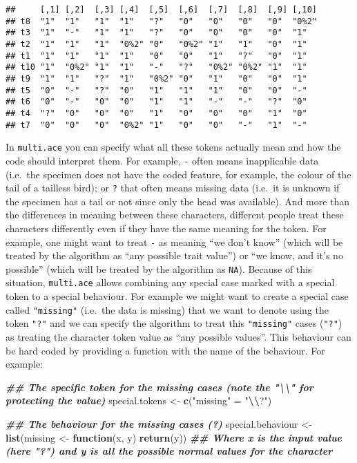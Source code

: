 \documentclass[
]{book}
\newenvironment{Shaded}{\begin{snugshade}}{\end{snugshade}}
\newcommand{\ControlFlowTok}[1]{\textcolor[rgb]{0.13,0.29,0.53}{\textbf{#1}}}
\newcommand{\DocumentationTok}[1]{\textcolor[rgb]{0.56,0.35,0.01}{\textbf{\textit{#1}}}}
\newcommand{\FunctionTok}[1]{\textcolor[rgb]{0.13,0.29,0.53}{\textbf{#1}}}
\newcommand{\NormalTok}[1]{#1}
\newcommand{\OtherTok}[1]{\textcolor[rgb]{0.56,0.35,0.01}{#1}}
\newcommand{\SpecialCharTok}[1]{\textcolor[rgb]{0.81,0.36,0.00}{\textbf{#1}}}
\newcommand{\StringTok}[1]{\textcolor[rgb]{0.31,0.60,0.02}{#1}}
\begin{document}
\begin{verbatim}
##     [,1] [,2]  [,3] [,4]  [,5]  [,6]  [,7]  [,8]  [,9] [,10]
## t8  "1"  "1"   "1"  "1"   "?"   "0"   "0"   "0"   "0"  "0%2"
## t3  "1"  "-"   "1"  "1"   "?"   "0"   "0"   "0"   "0"  "1"  
## t2  "1"  "1"   "1"  "0%2" "0"   "0%2" "1"   "1"   "0"  "1"  
## t1  "1"  "1"   "1"  "1"   "0"   "0"   "1"   "?"   "0"  "1"  
## t10 "1"  "0%2" "1"  "1"   "-"   "?"   "0%2" "0%2" "1"  "1"  
## t9  "1"  "1"   "?"  "1"   "0%2" "0"   "1"   "0"   "0"  "1"  
## t5  "0"  "-"   "?"  "0"   "1"   "1"   "1"   "0"   "0"  "-"  
## t6  "0"  "-"   "0"  "0"   "1"   "1"   "-"   "-"   "?"  "0"  
## t4  "?"  "0"   "0"  "0"   "1"   "0"   "0"   "0"   "1"  "0"  
## t7  "0"  "0"   "0"  "0%2" "1"   "0"   "0"   "-"   "1"  "-"
\end{verbatim}

In \texttt{multi.ace} you can specify what all these tokens actually mean and how the code should interpret them.
For example, \texttt{-} often means inapplicable data (i.e.~the specimen does not have the coded feature, for example, the colour of the tail of a tailless bird); or \texttt{?} that often means missing data (i.e.~it is unknown if the specimen has a tail or not since only the head was available).
And more than the differences in meaning between these characters, different people treat these characters differently even if they have the same meaning for the token.
For example, one might want to treat \texttt{-} as meaning ``we don't know'' (which will be treated by the algorithm as ``any possible trait value'') or ``we know, and it's no possible'' (which will be treated by the algorithm as \texttt{NA}).
Because of this situation, \texttt{multi.ace} allows combining any special case marked with a special token to a special behaviour.
For example we might want to create a special case called \texttt{"missing"} (i.e.~the data is missing) that we want to denote using the token \texttt{"?"} and we can specify the algorithm to treat this \texttt{"missing"} cases (\texttt{"?"}) as treating the character token value as ``any possible values''.
This behaviour can be hard coded by providing a function with the name of the behaviour.
For example:

\begin{Shaded}
\begin{Highlighting}[]
\DocumentationTok{\#\# The specific token for the missing cases (note the "\textbackslash{}\textbackslash{}" for protecting the value)}
\NormalTok{special.tokens }\OtherTok{\textless{}{-}} \FunctionTok{c}\NormalTok{(}\StringTok{"missing"} \OtherTok{=} \StringTok{"}\SpecialCharTok{\textbackslash{}\textbackslash{}}\StringTok{?"}\NormalTok{)}

\DocumentationTok{\#\# The behaviour for the missing cases (?)}
\NormalTok{special.behaviour }\OtherTok{\textless{}{-}} \FunctionTok{list}\NormalTok{(missing }\OtherTok{\textless{}{-}} \ControlFlowTok{function}\NormalTok{(x, y) }\FunctionTok{return}\NormalTok{(y))}
\DocumentationTok{\#\# Where x is the input value (here "?") and y is all the possible normal values for the character}
\end{Highlighting}
\end{Shaded}
\end{document}
